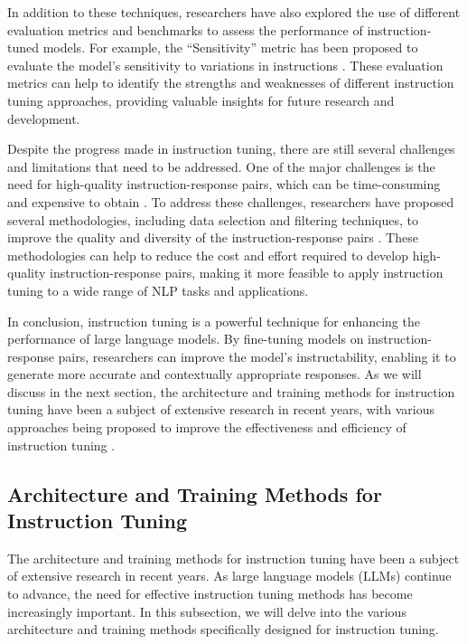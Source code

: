 \documentclass[11pt]{article}
\begin{document}
In addition to these techniques, researchers have also explored the use of different evaluation metrics and benchmarks to assess the performance of instruction-tuned models. For example, the ``Sensitivity'' metric has been proposed to evaluate the model's sensitivity to variations in instructions \cite{ref33}. These evaluation metrics can help to identify the strengths and weaknesses of different instruction tuning approaches, providing valuable insights for future research and development.

Despite the progress made in instruction tuning, there are still several challenges and limitations that need to be addressed. One of the major challenges is the need for high-quality instruction-response pairs, which can be time-consuming and expensive to obtain \cite{ref21}. To address these challenges, researchers have proposed several methodologies, including data selection and filtering techniques, to improve the quality and diversity of the instruction-response pairs \cite{ref34}. These methodologies can help to reduce the cost and effort required to develop high-quality instruction-response pairs, making it more feasible to apply instruction tuning to a wide range of NLP tasks and applications.

In conclusion, instruction tuning is a powerful technique for enhancing the performance of large language models. By fine-tuning models on instruction-response pairs, researchers can improve the model's instructability, enabling it to generate more accurate and contextually appropriate responses. As we will discuss in the next section, the architecture and training methods for instruction tuning have been a subject of extensive research in recent years, with various approaches being proposed to improve the effectiveness and efficiency of instruction tuning \cite{ref32}.

\subsection{Architecture and Training Methods for Instruction Tuning}

The architecture and training methods for instruction tuning have been a subject of extensive research in recent years. As large language models (LLMs) continue to advance, the need for effective instruction tuning methods has become increasingly important. In this subsection, we will delve into the various architecture and training methods specifically designed for instruction tuning.
\end{document}
